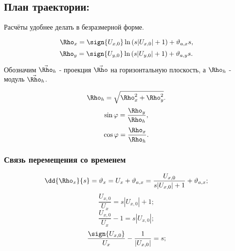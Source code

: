 \subsection{План траектории:}

Расчёты удобнее делать в безразмерной форме.

$$\Rho_x = \sign{U_{x,0}} \ln{( s|U_{x,0}| + 1 )} + \vartheta_{a,x}s,$$
$$\Rho_y = \sign{U_{y,0}} \ln{( s|U_{y,0}| + 1 )} + \vartheta_{a,y}s.$$

Обозначим $\vec{\Rho}_h$ - проекция $\vec{\Rho}$ на горизонтальную плоскость, а $\Rho_h$ - модуль $\vec{\Rho}_h$.

$$\Rho_h = \sqrt{\Rho_x^2 + \Rho_y^2}.$$
$$\sin{\varphi} = \frac{\Rho_y}{\Rho_h},$$
$$\cos{\varphi} = \frac{\Rho_x}{\Rho_h}.$$

\subsubsection{Связь перемещения со временем}
$$\dd{\Rho_x}{s} = \vartheta_x = U_x + \vartheta_{a,x} = \frac{U_{x,0}}{s|U_{x,0}| + 1} + \vartheta_{a,x};$$
$$\frac{U_{x,0}}{U_x} = s|U_{x,0}| + 1;$$
$$\frac{U_{x,0}}{U_x} -1 = s|U_{x,0}|;$$
$$\frac{\sign{U_{x,0}}}{U_x} - \frac{1}{|U_{x,0}|} = s;$$